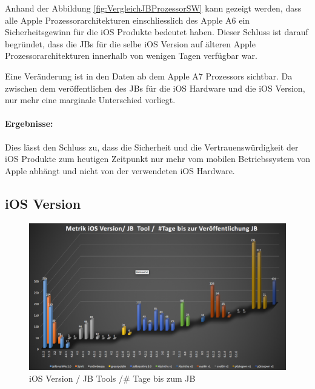 Anhand der Abbildung \ref{fig:VergleichJBProzessorSW} kann gezeigt werden, dass alle Apple Prozessorarchitekturen einschliesslich des Apple A6 ein Sicherheitsgewinn für die iOS Produkte bedeutet haben. Dieser Schluss ist darauf begründet, dass die JBs für die selbe iOS Version auf älteren Apple Prozessorarchitekturen innerhalb von wenigen Tagen verfügbar war. \par 
Eine Veränderung ist in den Daten ab dem Apple A7 Prozessors sichtbar. Da zwischen dem veröffentlichen des JBs für die iOS Hardware und die iOS Version, nur mehr eine marginale Unterschied vorliegt.
\paragraph{Ergebnisse:} Dies lässt den Schluss zu, dass die Sicherheit und die Vertrauenswürdigkeit der iOS Produkte zum heutigen Zeitpunkt nur mehr vom mobilen Betriebssystem von Apple abhängt und nicht von der verwendeten iOS Hardware. 

\newpage
\subsection{iOS Version}
\label{sec:Frage1iOSVersion} 

\begin{figure}[htbp!]
        \centering
                \includegraphics[scale=0.41]{Bilder/Frage1_1.png}
        \caption{iOS Version / JB Tools /\# Tage bis zum JB}
        \label{fig:AnalyseiOSJB1}        
\end{figure}

